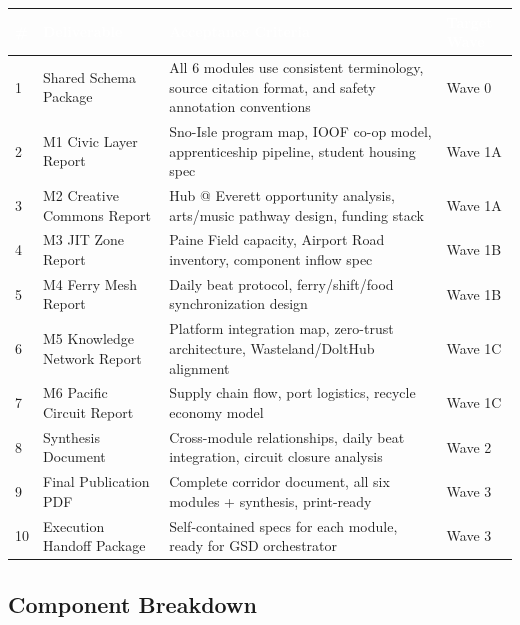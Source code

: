 \documentclass[11pt,letterpaper]{article}
\newcommand{\tableheader}[1]{\textbf{\sffamily\textcolor{white}{#1}}}
\begin{document}
\begin{center}
\begin{tabularx}{\textwidth}{C{0.5cm}L{3cm}XC{2cm}}
\toprule
{}
\tableheader{\#} & \tableheader{Deliverable} & \tableheader{Acceptance Criteria} & \tableheader{Target Wave} \\
 & Shared Schema Package & All 6 modules use consistent terminology, source citation format, and safety annotation conventions & Wave 0 \\
2 & M1 Civic Layer Report & Sno-Isle program map, IOOF co-op model, apprenticeship pipeline, student housing spec & Wave 1A \\
3 & M2 Creative Commons Report & Hub @ Everett opportunity analysis, arts/music pathway design, funding stack & Wave 1A \\
4 & M3 JIT Zone Report & Paine Field capacity, Airport Road inventory, component inflow spec & Wave 1B \\
5 & M4 Ferry Mesh Report & Daily beat protocol, ferry/shift/food synchronization design & Wave 1B \\
6 & M5 Knowledge Network Report & Platform integration map, zero-trust architecture, Wasteland/DoltHub alignment & Wave 1C \\
7 & M6 Pacific Circuit Report & Supply chain flow, port logistics, recycle economy model & Wave 1C \\
8 & Synthesis Document & Cross-module relationships, daily beat integration, circuit closure analysis & Wave 2 \\
9 & Final Publication PDF & Complete corridor document, all six modules + synthesis, print-ready & Wave 3 \\
10 & Execution Handoff Package & Self-contained specs for each module, ready for GSD orchestrator & Wave 3 \\
\bottomrule
\end{tabularx}
\end{center}

\subsection{Component Breakdown}
\end{document}
